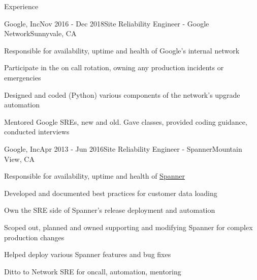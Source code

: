 \documentclass{resume}
\begin{document}
\begin{rSection}{Experience}
    \begin{rSubsection}{Google, Inc}{Nov 2016 - Dec 2018}{Site Reliability Engineer - Google Network}{Sunnyvale, CA}
      \item Responsible for availability, uptime and health of Google's internal network
      \item Participate in the on call rotation, owning any production incidents or emergencies
      \item Designed and coded (Python) various components of the network's upgrade automation
      \item Mentored Google SREs, new and old. Gave classes, provided coding guidance, conducted interviews
    \end{rSubsection}

    \begin{comment}
      \begin{rSubsection}{Machine Zone, Inc}{Jul 2016 - Oct 2016}{Senior Site Reliability Engineer}{Palo Alto, CA}
        \item Team lead, responsible for creating and enforcing SRE policies
        \item On call, responding to pages and maintaining production reliability of all of MZ's production systems
        \item Identify pain points and take lead in engineering solutions, removing the pain
        \item Define problems, organizing and assisting others to allow them to create solutions
        \item Change procedures and process based on what isn't working well and working with others to improve the status quo
        \item Work with Puppet, Foreman, Salt, Nginx, ELK and many more technologies
      \end{rSubsection}
    \end{comment}

    \begin{rSubsection}{Google, Inc}{Apr 2013 - Jun 2016}{Site Reliability Engineer - Spanner}{Mountain View, CA}
      \item Responsible for availability, uptime and health of \href{https://en.wikipedia.org/wiki/Spanner_(database)}{Spanner}
      \item Developed and documented best practices for customer data loading
      \item Own the SRE side of Spanner's release deployment and automation
      \item Scoped out, planned and owned supporting and modifying Spanner for complex production changes
      \item Helped deploy various Spanner features and bug fixes
      \item Ditto to Network SRE for oncall, automation, mentoring
    \end{rSubsection}


\end{rSection}
\end{document}
